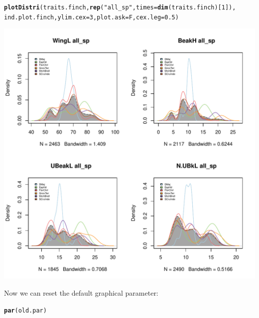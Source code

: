 \documentclass[12pt]{article}\usepackage[]{graphicx}\usepackage[]{color}
\makeatletter
\def\maxwidth{ %
  \ifdim\Gin@nat@width>\linewidth
    \linewidth
  \else
    \Gin@nat@width
  \fi
}
\newcommand{\hlnum}[1]{\textcolor[rgb]{0.686,0.059,0.569}{#1}}%
\newcommand{\hlstr}[1]{\textcolor[rgb]{0.192,0.494,0.8}{#1}}%
\newcommand{\hlstd}[1]{\textcolor[rgb]{0.345,0.345,0.345}{#1}}%
\newcommand{\hlkwc}[1]{\textcolor[rgb]{0.333,0.667,0.333}{#1}}%
\newcommand{\hlkwd}[1]{\textcolor[rgb]{0.737,0.353,0.396}{\textbf{#1}}}%
\newenvironment{kframe}{%
 \def\at@end@of@kframe{}%
 \ifinner\ifhmode%
  \def\at@end@of@kframe{\end{minipage}}%
  \begin{minipage}{\columnwidth}%
 \fi\fi%
 \def\FrameCommand##1{\hskip\@totalleftmargin \hskip-\fboxsep
 \colorbox{shadecolor}{##1}\hskip-\fboxsep
     \hskip-\linewidth \hskip-\@totalleftmargin \hskip\columnwidth}%
 \MakeFramed {\advance\hsize-\width
   \@totalleftmargin\z@ \linewidth\hsize
   \@setminipage}}%
 {\par\unskip\endMakeFramed%
 \at@end@of@kframe}
\newenvironment{knitrout}{}{} %
\makeatother
\begin{document}
\begin{knitrout}
\color{fgcolor}\begin{kframe}
\begin{alltt}
\hlkwd{plotDistri}\hlstd{(traits.finch,} \hlkwd{rep}\hlstd{(}\hlstr{"all_sp"}\hlstd{,} \hlkwc{times} \hlstd{=} \hlkwd{dim}\hlstd{(traits.finch)[}\hlnum{1}\hlstd{]),}
           \hlstd{ind.plot.finch,} \hlkwc{ylim.cex} \hlstd{=} \hlnum{3}\hlstd{,} \hlkwc{plot.ask} \hlstd{= F,} \hlkwc{cex.leg} \hlstd{=} \hlnum{0.5}\hlstd{)}
\end{alltt}
\end{kframe}
\includegraphics[width=\maxwidth]{figure/unnamed-chunk-14-1} 

\end{knitrout}

Now we can reset the default graphical parameter:
\begin{knitrout}
\color{fgcolor}\begin{kframe}
\begin{alltt}
\hlkwd{par}\hlstd{(old.par)}
\end{alltt}
\end{kframe}
\end{knitrout}
\newpage

\end{document}
